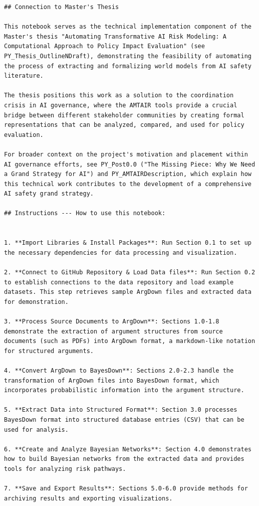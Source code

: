 \documentclass[
  11pt,
  letterpaper,
]{book}
\begin{document}
\begin{verbatim}
## Connection to Master's Thesis

This notebook serves as the technical implementation component of the Master's thesis "Automating Transformative AI Risk Modeling: A Computational Approach to Policy Impact Evaluation" (see PY_Thesis_OutlineNDraft), demonstrating the feasibility of automating the process of extracting and formalizing world models from AI safety literature.

The thesis positions this work as a solution to the coordination crisis in AI governance, where the AMTAIR tools provide a crucial bridge between different stakeholder communities by creating formal representations that can be analyzed, compared, and used for policy evaluation.

For broader context on the project's motivation and placement within AI governance efforts, see PY_Post0.0 ("The Missing Piece: Why We Need a Grand Strategy for AI") and PY_AMTAIRDescription, which explain how this technical work contributes to the development of a comprehensive AI safety grand strategy.

## Instructions --- How to use this notebook:


1. **Import Libraries & Install Packages**: Run Section 0.1 to set up the necessary dependencies for data processing and visualization.

2. **Connect to GitHub Repository & Load Data files**: Run Section 0.2 to establish connections to the data repository and load example datasets. This step retrieves sample ArgDown files and extracted data for demonstration.

3. **Process Source Documents to ArgDown**: Sections 1.0-1.8 demonstrate the extraction of argument structures from source documents (such as PDFs) into ArgDown format, a markdown-like notation for structured arguments.

4. **Convert ArgDown to BayesDown**: Sections 2.0-2.3 handle the transformation of ArgDown files into BayesDown format, which incorporates probabilistic information into the argument structure.

5. **Extract Data into Structured Format**: Section 3.0 processes BayesDown format into structured database entries (CSV) that can be used for analysis.

6. **Create and Analyze Bayesian Networks**: Section 4.0 demonstrates how to build Bayesian networks from the extracted data and provides tools for analyzing risk pathways.

7. **Save and Export Results**: Sections 5.0-6.0 provide methods for archiving results and exporting visualizations.



\end{verbatim}
\end{document}
